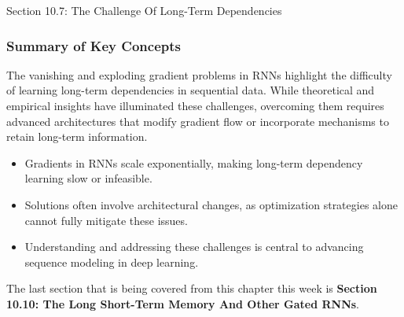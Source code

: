\begin{notes}{Section 10.7: The Challenge Of Long-Term Dependencies}
    \subsubsection*{Summary of Key Concepts}
    
    The vanishing and exploding gradient problems in RNNs highlight the difficulty of learning long-term dependencies in sequential data. While theoretical and empirical insights have illuminated these 
    challenges, overcoming them requires advanced architectures that modify gradient flow or incorporate mechanisms to retain long-term information.
    
    \begin{highlight}
        \begin{itemize}
            \item Gradients in RNNs scale exponentially, making long-term dependency learning slow or infeasible.
            \item Solutions often involve architectural changes, as optimization strategies alone cannot fully mitigate these issues.
            \item Understanding and addressing these challenges is central to advancing sequence modeling in deep learning.
        \end{itemize}
    \end{highlight}
\end{notes}

The last section that is being covered from this chapter this week is \textbf{Section 10.10: The Long Short-Term Memory And Other Gated RNNs}.

